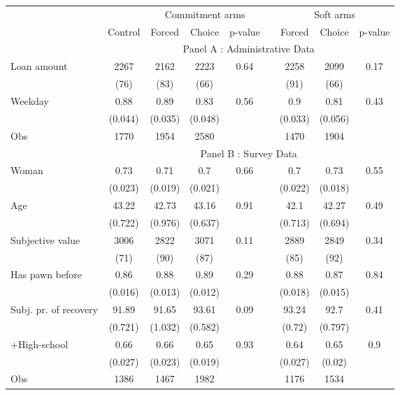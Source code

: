 \begin{tabular}{lcccccccc}
\toprule
      &       & \multicolumn{3}{c}{Commitment arms} &       & \multicolumn{3}{c}{Soft arms} \\
\cmidrule{3-5}\cmidrule{7-9}      & \multicolumn{1}{p{4.545em}}{Control} & \multicolumn{1}{p{4.955em}}{Forced} & \multicolumn{1}{p{3.455em}}{Choice} & \multicolumn{1}{p{3.455em}}{p-value} &       & \multicolumn{1}{p{4.045em}}{Forced} & \multicolumn{1}{p{4.045em}}{Choice } & \multicolumn{1}{p{4.545em}}{p-value} \\
\midrule
      & \multicolumn{8}{c}{Panel A : Administrative Data} \\
\midrule
\midrule
Loan amount  & 2267  & 2162  & 2223  & 0.64  &       & 2258  & 2099  & 0.17 \\
      & (76)  & (83)  & (66)  &       &       & (91)  & (66)  &  \\
Weekday & 0.88  & 0.89  & 0.83  & 0.56  &       & 0.9   & 0.81  & 0.43 \\
      & (0.044) & (0.035) & (0.048) &       &       & (0.033) & (0.056) &  \\
\midrule
Obs   & 1770  & 1954  & 2580  &       &       & 1470  & 1904  &  \\
\midrule
      & \multicolumn{8}{c}{Panel B : Survey Data} \\
\midrule
\midrule
Woman & 0.73  & 0.71  & 0.7   & 0.66  &       & 0.7   & 0.73  & 0.55 \\
      & (0.023) & (0.019) & (0.021) &       &       & (0.022) & (0.018) &  \\
Age   & 43.22 & 42.73 & 43.16 & 0.91  &       & 42.1  & 42.27 & 0.49 \\
      & (0.722) & (0.976) & (0.637) &       &       & (0.713) & (0.694) &  \\
Subjective value & 3006  & 2822  & 3071  & 0.11  &       & 2889  & 2849  & 0.34 \\
      & (71)  & (90)  & (87)  &       &       & (85)  & (92)  &  \\
Has pawn before & 0.86  & 0.88  & 0.89  & 0.29  &       & 0.88  & 0.87  & 0.84 \\
      & (0.016) & (0.013) & (0.012) &       &       & (0.018) & (0.015) &  \\
Subj. pr. of recovery & 91.89 & 91.65 & 93.61 & 0.09  &       & 93.24 & 92.7  & 0.41 \\
      & (0.721) & (1.032) & (0.582) &       &       & (0.72) & (0.797) &  \\
+High-school & 0.66  & 0.66  & 0.65  & 0.93  &       & 0.64  & 0.65  & 0.9 \\
      & (0.027) & (0.023) & (0.019) &       &       & (0.027) & (0.02) &  \\
\midrule
Obs   & 1386  & 1467  & 1982  &       &       & 1176  & 1534  &  \\
\bottomrule
\bottomrule
\end{tabular}%
